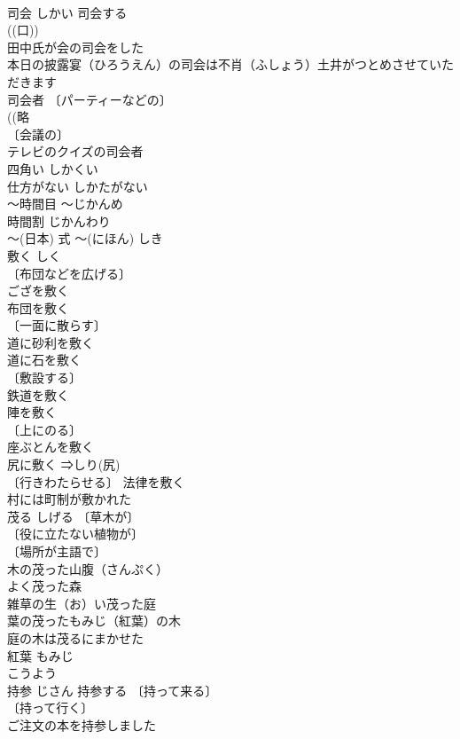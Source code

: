 \documentclass[8pt]{extreport}
\begin{document}
\begin{CJK}{UTF8}{min}
\\	司会	しかい	司会する 
\\	((口)) 
\\	田中氏が会の司会をした 
\\	本日の披露宴（ひろうえん）の司会は不肖（ふしょう）土井がつとめさせていただきます 
\\	司会者 〔パーティーなどの〕
\\	((略
\\	〔会議の〕
\\	テレビのクイズの司会者 
\\	四角い	しかくい	
\\	仕方がない	しかたがない	
\\	～時間目	～じかんめ	
\\	時間割	じかんわり	
\\	〜(日本) 式	～(にほん) しき	
\\	敷く	しく	
\\	〔布団などを広げる〕
\\	ござを敷く 
\\	布団を敷く 
\\	〔一面に散らす〕
\\	道に砂利を敷く 
\\	道に石を敷く 
\\	〔敷設する〕
\\	鉄道を敷く 
\\	陣を敷く 
\\	〔上にのる〕
\\	座ぶとんを敷く 
\\	尻に敷く ⇒しり(尻) 
\\	〔行きわたらせる〕 法律を敷く 
\\	村には町制が敷かれた 
\\	茂る	しげる	〔草木が〕
\\	〔役に立たない植物が〕
\\	〔場所が主語で〕
\\	木の茂った山腹（さんぷく） 
\\	よく茂った森 
\\	雑草の生（お）い茂った庭 
\\	葉の茂ったもみじ（紅葉）の木 
\\	庭の木は茂るにまかせた 
\\	紅葉 もみじ 
\\	こうよう 
\\	持参	じさん	持参する 〔持って来る〕
\\	〔持って行く〕
\\	ご注文の本を持参しました 

\end{CJK}
\end{document}
